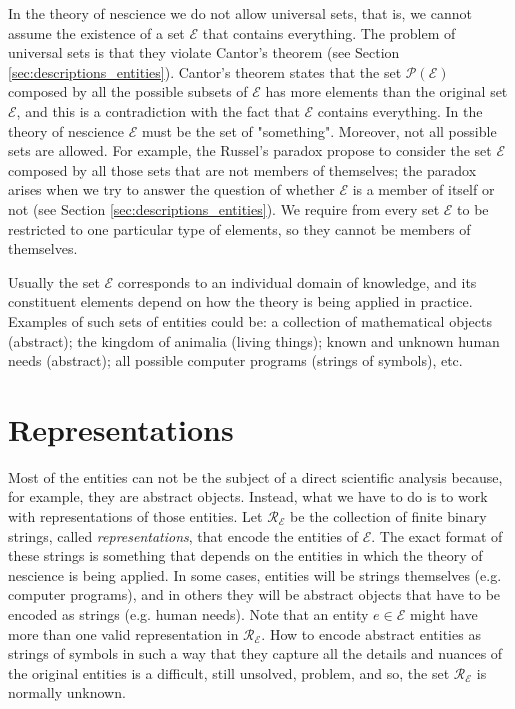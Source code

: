 In the theory of nescience we do not allow universal sets, that is, we cannot assume the existence of a set $\mathcal{E}$ that contains everything. The problem of universal sets is that they violate Cantor's theorem (see Section \ref{sec:descriptions_entities}). Cantor's theorem states that the set $\mathcal{P}(\mathcal{E})$ composed by all the possible subsets of $\mathcal{E}$ has more elements than the original set $\mathcal{E}$, and this is a contradiction with the fact that $\mathcal{E}$ contains everything. In the theory of nescience $\mathcal{E}$ must be the set of "something". Moreover, not all possible sets are allowed. For example, the Russel's paradox propose to consider the set $\mathcal{E}$ composed by all those sets that are not members of themselves; the paradox arises when we try to answer the question of whether $\mathcal{E}$ is a member of itself or not (see Section \ref{sec:descriptions_entities}). We require from every set $\mathcal{E}$ to be restricted to one particular type of elements, so they cannot be members of themselves.

Usually the set $\mathcal{E}$ corresponds to an individual domain of knowledge, and its constituent elements depend on how the theory is being applied in practice. Examples of such sets of entities could be: a collection of mathematical objects (abstract); the kingdom of animalia (living things); known and unknown human needs (abstract); all possible computer programs (strings of symbols), etc.

%
%

\section{Representations}

Most of the entities can not be the subject of a direct scientific analysis because, for example, they are abstract objects. Instead, what we have to do is to work with representations of those entities. Let $\mathcal{R_\mathcal{E}}$ be the collection of finite binary strings, called \emph{representations}, that encode the entities of $\mathcal{E}$. The exact format of these strings is something that depends on the entities in which the theory of nescience is being applied. In some cases, entities will be strings themselves (e.g. computer programs), and in others they will be abstract objects that have to be encoded as strings (e.g. human needs). Note that an entity $e \in \mathcal{E}$ might have more than one valid representation in $\mathcal{R_\mathcal{E}}$. How to encode abstract entities as strings of symbols in such a way that they capture all the details and nuances of the original entities is a difficult, still unsolved, problem, and so, the set $\mathcal{R_\mathcal{E}}$ is normally unknown. 

